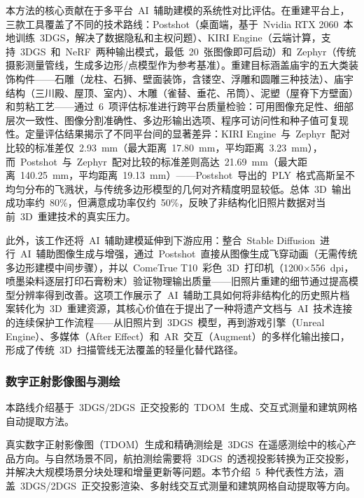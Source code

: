 本方法的核心贡献在于多平台~AI~辅助建模的系统性对比评估。在重建平台上，三款工具覆盖了不同的技术路线：Postshot（桌面端，基于~Nvidia RTX 2060~本地训练~3DGS，解决了数据隐私和主权问题）、KIRI Engine（云端计算，支持~3DGS~和~NeRF~两种输出模式，最低~20~张图像即可启动）和~Zephyr（传统摄影测量管线，生成多边形/点模型作为参考基准）。重建目标涵盖庙宇的五大类装饰构件——石雕（龙柱、石狮、壁面装饰，含镂空、浮雕和圆雕三种技法）、庙宇结构（三川殿、屋顶、室内）、木雕（雀替、垂花、吊筒）、泥塑（屋脊下方壁面）和剪粘工艺——通过~6~项评估标准进行跨平台质量检验：可用图像充足性、细部层次一致性、图像分割准确性、多边形输出选项、程序可访问性和种子值可复现性。定量评估结果揭示了不同平台间的显著差异：KIRI Engine~与~Zephyr~配对比较的标准差仅~2.93~mm（最大距离~17.80~mm，平均距离~3.23~mm），而~Postshot~与~Zephyr~配对比较的标准差则高达~21.69~mm（最大距离~140.25~mm，平均距离~19.13~mm）——Postshot~导出的~PLY~格式高斯呈不均匀分布的飞溅状，与传统多边形模型的几何对齐精度明显较低。总体~3D~输出成功率约~80\%，但满意成功率仅约~50\%，反映了非结构化旧照片数据对当前~3D~重建技术的真实压力。

此外，该工作还将~AI~辅助建模延伸到下游应用：整合~Stable Diffusion~进行~AI~辅助图像生成与增强，通过~Postshot~直接从图像生成飞穿动画（无需传统多边形建模中间步骤），并以~ComeTrue T10~彩色~3D~打印机（1200$\times$556~dpi，喷墨染料逐层打印石膏粉末）验证物理输出质量——旧照片重建的细节通过提高模型分辨率得到改善。这项工作展示了~AI~辅助工具如何将非结构化的历史照片档案转化为~3D~重建资源，其核心价值在于提出了一种将遗产文档与~AI~技术连接的连续保护工作流程——从旧照片到~3DGS~模型，再到游戏引擎（Unreal Engine）、多媒体（After Effect）和~AR~交互（Augment）的多样化输出接口，形成了传统~3D~扫描管线无法覆盖的轻量化替代路径。

\subsubsection{数字正射影像图与测绘}

本路线介绍基于~3DGS/2DGS~正交投影的~TDOM~生成、交互式测量和建筑网格自动提取方法。

真实数字正射影像图（TDOM）生成和精确测绘是~3DGS~在遥感测绘中的核心产品方向。与自然场景不同，航拍测绘需要将~3DGS~的透视投影转换为正交投影，并解决大规模场景分块处理和增量更新等问题。本节介绍~5~种代表性方法，涵盖~3DGS/2DGS~正交投影渲染、多射线交互式测量和建筑网格自动提取等方向。

